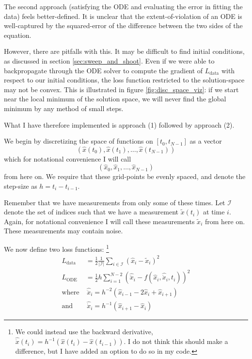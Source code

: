 \documentclass{article}
\begin{document}
The second approach (satisfying the ODE and evaluating the error in fitting the data) feels better-defined.
It is unclear that the extent-of-violation of an ODE is well-captured by the squared-error of the difference between the two sides of the equation.

However, there are pitfalls with this.
It may be difficult to find initial conditions, as discussed in section \ref{sec:sweep_and_shoot}.
Even if we were able to backpropagate through the ODE solver to compute the gradient of $L_{\mathrm{data}}$ with respect to our initial conditions, the loss function restricted to the solution-space may not be convex.
This is illustrated in figure \ref{fig:disc_space_viz}: if we start near the local minimum of the solution space, we will never find the global minimum by any method of small steps.

What I have therefore implemented is approach (1) followed by approach (2).

We begin by discretizing the space of functions on $[t_0, t_{N-1}]$ as a vector
$$
\left( \hat{x}(t_0), \hat{x}(t_1), \dots, \hat{x}(t_{N-1}) \right)
$$
which for notational convenience I will call
$$
\left( \hat{x}_0, \hat{x}_1, \dots, \hat{x}_{N-1} \right)
$$
from here on.
We require that these grid-points be evenly spaced, and denote the step-size as $h = t_i - t_{i-1}$.

Remember that we have measurements from only some of these times.
Let $\mathcal{I}$ denote the set of indices such that we have a measurement $\tilde{x}(t_i)$ at time $i$.
Again, for notational convenience I will call these measurements $\tilde{x}_i$ from here on.
These measurements may contain noise.

We now define two loss functions:%
\footnote{
We could instead use the backward derivative, $\hat{\dot{x}}(t_i) = h^{-1} \left( \hat{x}(t_{i}) -  \hat{x}(t_{i-1})\right)$. I do not think this should make a difference, but I have added an option to do so in my code.
}
\begin{align}
\label{eq:Ldata}
L_{\mathrm{data}} &= \frac{1}{2} \frac{1}{\left| \mathcal{I} \right|} \sum_{i \in \mathcal{I}} \left( \hat{x}_i - \tilde{x}_i \right)^2 \\
\label{eq:Lode}
L_{\mathrm{ODE}} &= \frac{1}{2} h \sum_{i=1}^{N-2} \left( \hat{\ddot{x}}_i - f\left( \hat{x}_i, \hat{\dot{x}}_i, t_i \right) \right)^2 \\
\mathrm{where} \, & \, \hat{\ddot{x}}_i = h^{-2} \left( \hat{x}_{i-1} - 2\hat{x}_i + \hat{x}_{i+1} \right) \\
\mathrm{and} \, & \, \hat{\dot{x}}_i = h^{-1} \left( \hat{x}_{i+1} - \hat{x}_i \right)
\end{align}
\end{document}
